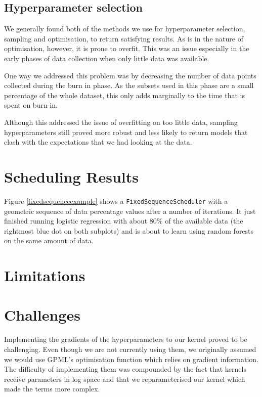 \documentclass[a4paper,12pt,twoside,openright]{report}
\begin{document}
\subsection{Hyperparameter selection}
We generally found both of the methods we use for hyperparameter selection, sampling and optimisation, to return satisfying results. As is in the nature of optimisation, however, it is prone to overfit. This was  an issue especially in the early phases of data collection when only little data was available.

One way we addressed this problem was by decreasing the number of data points collected during the burn in phase. As the subsets used in this phase are a small percentage of the whole dataset, this only adds marginally to the time that is spent on burn-in.

Although this addressed the issue of overfitting on too little data, sampling hyperparameters still proved more robust and less likely to return models that clash with the expectations that we had looking at the data.




\section{Scheduling Results}
Figure \ref{fixedsequenceexample} shows a \texttt{FixedSequenceScheduler} with a geometric sequence of data percentage values after a number of iterations. It just finished running logistic regression with about 80\% of the available data (the rightmost blue dot on both subplots) and is about to learn using random forests on the same amount of data.


\section{Limitations}
\section{Challenges}


Implementing the gradients of the hyperparameters to our kernel proved to be challenging. Even though we are not currently using them, we originally assumed we would use GPML's optimisation function which relies on gradient information. The difficulty of implementing them was compounded by the fact that kernels receive parameters in log space and that we reparameterised our kernel which made the terms more complex.
\end{document}
